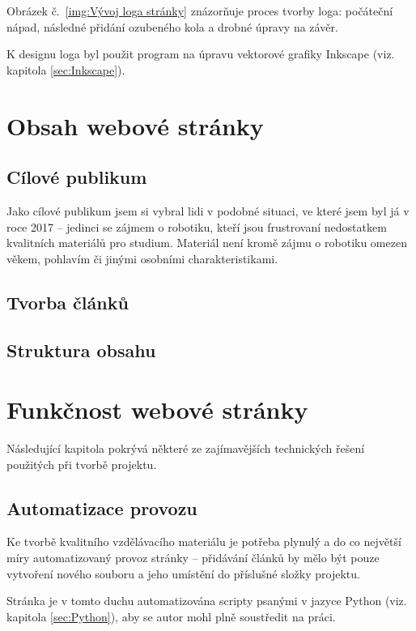\documentclass[a4paper, 12pt]{article}
\begin{document}
  Obrázek č.~\ref{img:Vývoj loga stránky} znázorňuje proces tvorby loga: počáteční nápad, následné přidání ozubeného kola a drobné úpravy na závěr.

  K designu loga byl použit program na úpravu vektorové grafiky Inkscape (viz. kapitola \ref{sec:Inkscape}).


  \section{Obsah webové stránky}

  \subsection{Cílové publikum}
  Jako cílové publikum jsem si vybral lidi v podobné situaci, ve které jsem byl já v roce 2017 -- jedinci se zájmem o robotiku, kteří jsou frustrovaní nedostatkem kvalitních materiálů pro studium. Materiál není kromě zájmu o robotiku omezen věkem, pohlavím či jinými osobními charakteristikami.


  \subsection{Tvorba článků} \label{sec:Tvorba článků}

  \subsection{Struktura obsahu}

  \section{Funkčnost webové stránky}
  Následující kapitola pokrývá některé ze zajímavějších technických řešení použitých při tvorbě projektu.


  \subsection{Automatizace provozu} \label{sec:Automatizace provozu}
  Ke tvorbě kvalitního vzdělávacího materiálu je potřeba plynulý a do co největší míry automatizovaný provoz stránky -- přidávání článků by mělo být pouze vytvoření nového souboru a jeho umístění do příslušné složky projektu.

  Stránka je v tomto duchu automatizována scripty psanými v jazyce Python (viz. kapitola \ref{sec:Python}), aby se autor mohl plně soustředit na práci.
\end{document}
